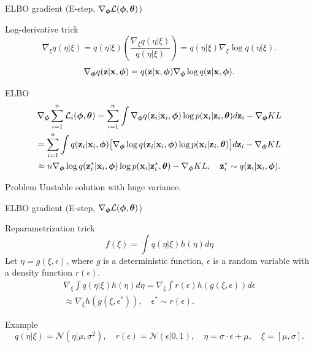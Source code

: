 \begin{frame}{ELBO gradient (E-step, $\nabla_{\boldsymbol{\phi}} \mathcal{L}(\boldsymbol{\phi}, \boldsymbol{\theta})$)}
	\begin{block}{Log-derivative trick}
		\vspace{-0.3cm}
		\[
		\nabla_\xi q(\eta| \xi) = q(\eta | \xi) \left( \frac{\nabla_\xi q(\eta | \xi)}{q(\eta| \xi)} \right) = q(\eta | \xi) \nabla_\xi \log q(\eta| \xi).
		\]
		\[
		\nabla_{\boldsymbol{\phi}} q(\mathbf{z}| \mathbf{x}, \boldsymbol{\phi}) = q(\mathbf{z}| \mathbf{x}, \boldsymbol{\phi}) \nabla_{\boldsymbol{\phi}} \log q(\mathbf{z}| \mathbf{x}, \boldsymbol{\phi}).
		\]
	\end{block}
	\begin{block}{ELBO}
		\vspace{-0.5cm}
		\begin{multline*}
			\nabla_{\boldsymbol{\phi}} \sum_{i=1}^n \mathcal{L}_i (\boldsymbol{\phi}, \boldsymbol{\theta}) = \sum_{i=1}^n \int \nabla_{\boldsymbol{\phi}} q(\mathbf{z}_i| \mathbf{x}_i, \boldsymbol{\phi}) \log p(\mathbf{x}_i |\mathbf{z}_i, \boldsymbol{\theta}) d\mathbf{z}_i  - \nabla_{\boldsymbol{\phi}} KL \\ 
			= \sum_{i=1}^n \int q(\mathbf{z}_i | \mathbf{x}_i, \boldsymbol{\phi}) \bigl[  \nabla_{\boldsymbol{\phi}} \log q(\mathbf{z}_i| \mathbf{x}_i, \boldsymbol{\phi}) \log p(\mathbf{x}_i |\mathbf{z}_i, \boldsymbol{\theta}) \bigr] d\mathbf{z}_i - \nabla_{\boldsymbol{\phi}} KL \\ \approx n \nabla_{\boldsymbol{\phi}} \log q(\mathbf{z}_i^*| \mathbf{x}_i, \boldsymbol{\phi}) \log p(\mathbf{x}_i |\mathbf{z}_i^*, \boldsymbol{\theta}) - \nabla_{\boldsymbol{\phi}} KL, \quad \mathbf{z}_i^* \sim q(\mathbf{z}_i| \mathbf{x}_i, \boldsymbol{\phi}).
		\end{multline*}
	\end{block}
	\vspace{-0.2cm}
	\begin{block}{Problem} 
		Unstable solution with huge variance.
	\end{block}
\end{frame}
\begin{frame}{ELBO gradient (E-step, $\nabla_{\boldsymbol{\phi}} \mathcal{L}(\boldsymbol{\phi}, \boldsymbol{\theta})$)}
	\begin{block}{Reparametrization trick}
		\vspace{-0.3cm}
		\[
		f(\xi) = \int q(\eta|\xi) h(\eta) d\eta
		\]
		Let $\eta = g(\xi, \epsilon)$, where $g$ is a deterministic function, $\epsilon$ is a random variable with a density function $r(\epsilon)$.
		\begin{multline*}
			\nabla_\xi \int q(\eta|\xi) h(\eta) d\eta = \nabla_\xi \int r(\epsilon) h(g(\xi, \epsilon)) d \epsilon \\
			\approx \nabla_\xi h(g(\xi, \epsilon^*)), \quad \epsilon^* \sim r(\epsilon).
		\end{multline*}
	\end{block}
	\vspace{-0.1cm}
	\begin{block}{Example}
		\vspace{-0.3cm}
		\[
		q(\eta|\xi) = \mathcal{N}(\eta| \mu, \sigma^2), \quad r(\epsilon) = \mathcal{N}(\epsilon|0, 1), \quad \eta = \sigma \cdot \epsilon + \mu, \quad \xi = [\mu, \sigma].
		\]
	\end{block}
\end{frame}
